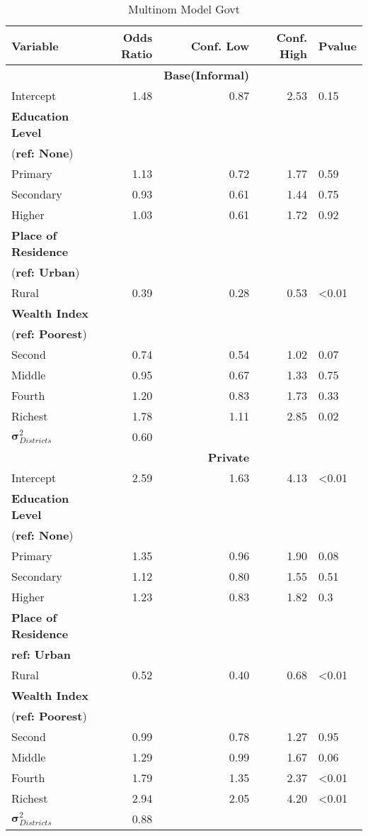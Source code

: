 \documentclass[
  letterpaper,
  DIV=11,
  numbers=noendperiod]{scrartcl}
\begin{document}
\begin{table}

\caption{\label{tab:multinom-mod-full-govt}Multinom Model Govt}
\centering
\begin{tabular}[t]{lrrrl}
\toprule
\textbf{Variable} & \textbf{Odds Ratio} & \textbf{Conf. Low} & \textbf{Conf. High} & \textbf{Pvalue}\\
\midrule
\addlinespace
& & \textbf{Base(Informal)} & & \\
\addlinespace
Intercept & 1.48 & 0.87 & 2.53 & 0.15\\
\addlinespace
\textbf{Education Level} \\
(\textbf{ref: None}) \\
\quad Primary & 1.13 & 0.72 & 1.77 & 0.59\\
\quad Secondary & 0.93 & 0.61 & 1.44 & 0.75\\
\quad Higher & 1.03 & 0.61 & 1.72 & 0.92\\
\addlinespace
\textbf{Place of Residence} \\
(\textbf{ref: Urban}) \\
\quad Rural & 0.39 & 0.28 & 0.53 & <0.01\\
\addlinespace
\textbf{Wealth Index}  \\
(\textbf{ref: Poorest})  \\
\quad Second & 0.74 & 0.54 & 1.02 & 0.07\\
\quad Middle & 0.95 & 0.67 & 1.33 & 0.75\\
\quad Fourth & 1.20 & 0.83 & 1.73 & 0.33\\
\quad Richest & 1.78 & 1.11 & 2.85 & 0.02\\
\addlinespace
$\pmb\sigma^2_{Districts}$ & 0.60 & & \\
\addlinespace
\addlinespace
 & & \textbf{Private} & & \\
\addlinespace
\addlinespace
Intercept & 2.59 & 1.63 & 4.13 & <0.01\\
\addlinespace
\textbf{Education Level} & & & & \\
(\textbf{ref: None}) & & & & \\
\quad Primary & 1.35 & 0.96 & 1.90 & 0.08\\
\quad Secondary & 1.12 & 0.80 & 1.55 & 0.51\\
\quad Higher & 1.23 & 0.83 & 1.82 & 0.3\\
\addlinespace
\textbf{Place of Residence} \\
\textbf{ref: Urban} \\
\quad Rural & 0.52 & 0.40 & 0.68 & <0.01\\
\addlinespace
\textbf{Wealth Index} \\
(\textbf{ref: Poorest}) \\
\quad Second & 0.99 & 0.78 & 1.27 & 0.95\\
\quad Middle & 1.29 & 0.99 & 1.67 & 0.06\\
\quad Fourth & 1.79 & 1.35 & 2.37 & <0.01\\
\quad Richest & 2.94 & 2.05 & 4.20 & <0.01\\
\addlinespace
$\pmb\sigma^2_{Districts}$ & 0.88 & & \\
\bottomrule
\end{tabular}
\end{table}
\end{document}
